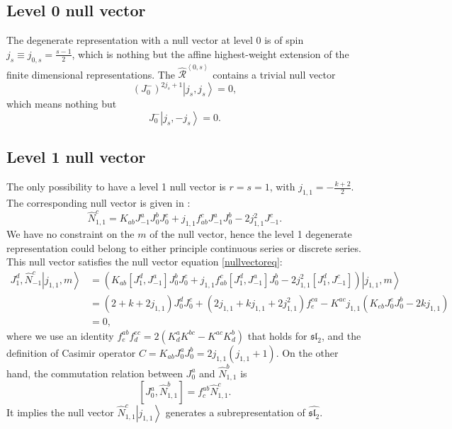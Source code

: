 \documentclass[10pt,a4paper]{article}
\numberwithin{equation}{section}
\newcommand{\ket}[1]{\left| #1 \right\rangle}
\newcommand{\vev}[1]{\left\langle #1 \right\rangle}
\begin{document}
\subsection{Level 0 null vector}
The degenerate representation with a null vector at level 0 is of spin $j_{s} \equiv j_{0,s}  = \frac{s-1}{2}$, which is nothing but the affine 
highest-weight extension of the finite dimensional representations. The $\widehat{\mathcal{R}}^{\vev{0,s}}$ contains a trivial null 
vector 
\begin{equation}
    \left(J^{-}_{0}\right)^{2j_{s}+1}\ket{j_{s},j_{s}} = 0,
\end{equation}
which means nothing but 
\begin{equation}
    J^{-}_{0} \ket{j_{s},-j_{s}} = 0.
\end{equation}

\subsection{Level 1 null vector}
The only possibility to have a level 1 null vector is $r = s = 1$, with $j_{1,1} = -\frac{k+2}{2}$. 
The corresponding null vector is given in \cite{Stocco:2022gah}:
\begin{equation}
    \hat{N}^{c}_{1,1} = K_{ab} J^{a}_{-1} J^{b}_{0} J^{c}_{0} + j_{1,1} f^{c}_{ab} J^{a}_{-1} J^{b}_{0} - 2 j^{2}_{1,1} J^{c}_{-1}. \label{nullvector}
\end{equation}
We have no constraint on the $m$ of the null vector, hence the level 1 degenerate representation could belong to either 
principle continuous series or discrete series. This null vector satisfies the null vector equation \eqref{nullvectoreq}:
\begin{equation}
    \begin{aligned}
        J^{d}_{1}, \hat{N}^{c}_{-1} \ket{j_{1,1},m}
        &= \left( K_{ab} \left[J^{d}_{1},J^{a}_{-1}\right] J^{b}_{0} J^{c}_{0} + j_{1,1} f^{c}_{ab} \left[J^{d}_{1},J^{a}_{-1}\right] J^{b}_{0} - 2 j^{2}_{1,1} \left[J^{d}_{1},J^{c}_{-1}\right] \right)\ket{j_{1,1},m} \\
        &= (2+k+2j_{1,1})J^{d}_{0} J^{c}_{0} + (2j_{1,1} + kj_{1,1}+2j^{2}_{1,1})f^{ca}_{e} - K^{ac}j_{1,1}(K_{eb}J^{e}_{0}J^{b}_{0}-2k j_{1,1})\\
        &= 0,
    \end{aligned}
\end{equation}
where we use an identity $f^{ab}_{e} f^{ec}_{d} = 2(K^{a}_{d}K^{bc}- K^{ac}K^{b}_{d})$ that holds for $\mathfrak{sl}_{2}$, and 
the definition of Casimir operator $C = K_{ab} J^{a}_{0} J^{b}_{0} = 2j_{1,1}(j_{1,1}+1)$. On the other hand, the commutation relation 
between $J^{a}_{0}$ and $\hat{N}^{b}_{1,1}$ is 
\begin{equation}
    \left[ J^{a}_{0},\hat{N}^{b}_{1,1} \right] = f^{ab}_{c} \hat{N}^{c}_{1,1}. \label{CRJN}
\end{equation}
It implies the null vector $\hat{N}^{c}_{1,1} \ket{j_{1,1}}$ generates a subrepresentation of $\widehat{\mathfrak{sl}_{2}}$.
\end{document}
